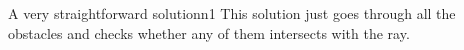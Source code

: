 \documentclass{writeup}
\begin{document}
\begin{solutions}
  \begin{solution}{A very straightforward solution}{n}{1}
    This solution just goes through all the obstacles and checks whether any of them intersects with the ray.
  \end{solution}
\end{solutions}
\end{document}
